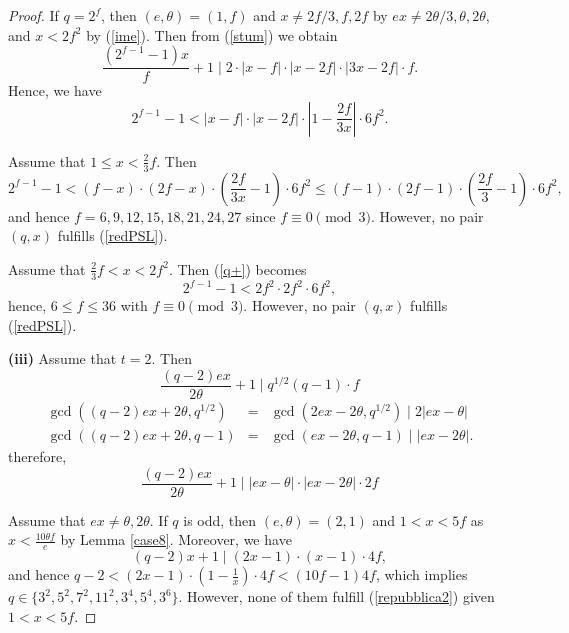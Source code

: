 \documentclass[a4paper,twopage,reqno,12pt]{amsart}
\theoremstyle{definition}
\numberwithin{equation}{section}
\renewcommand{\leq}{\leqslant}
\begin{document}
\begin{proof}
If $q=2^{f}$, then $(e,\theta )=(1,f)$ and 
$x\neq 2f/3,f,2f$ by
$ex\neq 2\theta/3,\theta, 2\theta$,
and $x<2f^{2}$ by (\ref{ime}). Then from (\ref{stum}) we obtain 
\begin{equation*}
\frac{\left( 2^{f-1}-1\right) x}{f }+1\mid 2\cdot \left\vert x-f \right\vert\cdot \left\vert
x-2f \right\vert \cdot \left\vert 3x-2f\right\vert \cdot f.
\end{equation*}
Hence, we have 
\begin{equation}\label{q+}
2^{f-1}-1 < \left\vert x-f\right\vert \cdot \left\vert x-2f\right\vert \cdot \left\vert 1-\frac{2f}{3x}\right\vert \cdot  6f^{2}.
\end{equation}%

Assume that $1\leq x<\frac{2}{3}f$. Then
\begin{equation*}
2^{f-1}-1 
<(f-x)\cdot(2f-x)\cdot\left(\frac{2f}{3x}-1\right)\cdot6f^2
\leq \left(f -1\right) \cdot \left(2f-1\right) \cdot\left(\frac{2f}{3}-1\right) \cdot  6f^{2},
\end{equation*}
and hence $f=6,9,12,15,18,21,24,27$ since $f \equiv 0 \pmod{3}$. However, no pair $(q,x)$ fulfills (\ref{redPSL}).


Assume that $\frac{2}{3}f<x<2f^{2}$. Then (\ref{q+}) becomes
\begin{equation*}
2^{f-1}-1 
<2f^2\cdot2f^2\cdot6f^2,
\end{equation*}
hence, $6\le f \le 36$ with $f \equiv 0 \pmod{3}$. However, no pair $(q,x)$ fulfills (\ref{redPSL}). 

\noindent \textbf{(iii)} Assume that $t=2$. Then
\begin{equation}\label{repubblica2}
\frac{\left( q-2\right) ex}{2\theta }+1\mid q^{1/2}(q-1)\cdot f
\end{equation}
\begin{eqnarray*}
\gcd \left( \left( q-2\right) ex+2\theta ,q^{1/2}\right)  &=&\gcd \left(
2ex-2\theta ,q^{1/2}\right) \mid 2|ex-\theta | \\
\gcd \left( \left( q-2\right) ex+2\theta ,q-1\right)  &=&\gcd \left(
ex-2\theta ,q-1\right) \mid |ex-2\theta| \text{.}
\end{eqnarray*}%
therefore, 
\[
\frac{\left( q-2\right) ex}{2\theta }+1\mid \left\vert ex-\theta \right\vert \cdot \left\vert ex-2\theta \right\vert \cdot
2f
\]%


Assume that $ex\neq \theta, 2\theta $. If $q$ is odd, then $(e,\theta )=(2,1)$ and $1<x<5f$ as $x<\frac{10\theta f}{e}$ by Lemma \ref{case8}.
Moreover, we have  
\[
\left( q-2\right)x+1\mid \left( 2x-1 \right) \cdot \left( x-1 \right) \cdot4f,
\]
and hence $q-2<(2x-1)\cdot(1-\frac{1}{x})\cdot4f<(10f-1)4f$, which implies 
$q\in \{3^2,5^2,7^2,11^2,3^4,5^4,3^6\}$. 
However, none of them fulfill (\ref{repubblica2}) given $1<x<5f$.


\end{proof}
\end{document}
